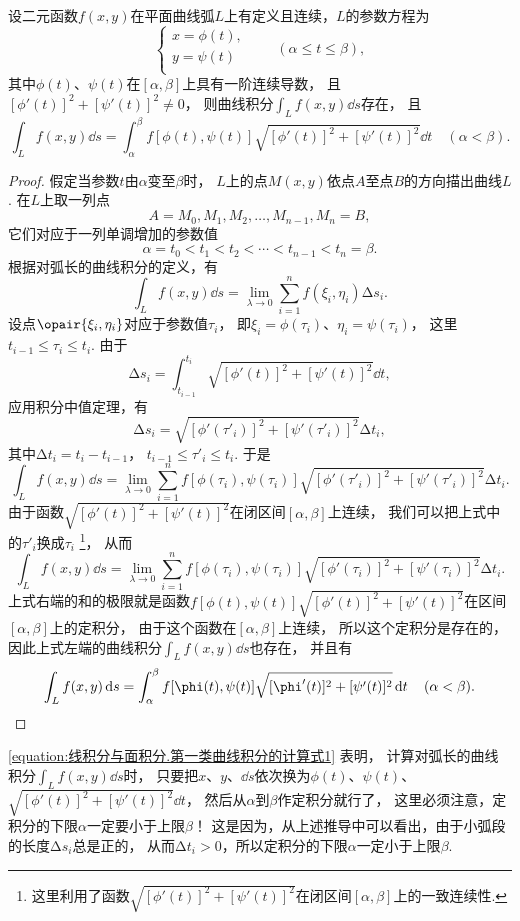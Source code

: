 \begin{theorem}
设二元函数\(f(x,y)\)在平面曲线弧\(L\)上有定义且连续，\(L\)的参数方程为\[
\left\{ \begin{array}{l}
x = \phi(t), \\
y = \psi(t) \\
\end{array} \right.
\qquad
(\alpha \leq t \leq \beta),
\]其中\(\phi(t)\)、\(\psi(t)\)在\([\alpha,\beta]\)上具有一阶连续导数，
且\([\phi'(t)]^2+[\psi'(t)]^2 \neq 0\)，
则曲线积分\(\int_L f(x,y) \dd{s}\)存在，
且\begin{equation}\label{equation:线积分与面积分.第一类曲线积分的计算式1}
\int_L f(x,y) \dd{s}
= \int_\alpha^\beta f[\phi(t),\psi(t)] \sqrt{[\phi'(t)]^2+[\psi'(t)]^2} \dd{t}
\quad(\alpha<\beta).
\end{equation}
\begin{proof}
假定当参数\(t\)由\(\alpha\)变至\(\beta\)时，
\(L\)上的点\(M(x,y)\)依点\(A\)至点\(B\)的方向描出曲线\(L\).
在\(L\)上取一列点\[
A=M_0,M_1,M_2,\dotsc,M_{n-1},M_n=B,
\]它们对应于一列单调增加的参数值\[
\alpha=t_0<t_1<t_2<\dotsb<t_{n-1}<t_n=\beta.
\]根据对弧长的曲线积分的定义，有\[
\int_L f(x,y) \dd{s} = \lim_{\lambda\to0} \sum_{i=1}^n f(\xi_i,\eta_i) \increment s_i.
\]设点\(\opair{\xi_i,\eta_i}\)对应于参数值\(\tau_i\)，
即\(\xi_i=\phi(\tau_i)\)、\(\eta_i=\psi(\tau_i)\)，
这里\(t_{i-1}\leq\tau_i\leq t_i\).
由于\[
\increment s_i = \int_{t_{i-1}}^{t_i} \sqrt{[\phi'(t)]^2+[\psi'(t)]^2} \dd{t},
\]应用积分中值定理，有\[
\increment s_i = \sqrt{[\phi'(\tau'_i)]^2+[\psi'(\tau'_i)]^2} \increment t_i,
\]其中\(\increment t_i = t_i - t_{i-1}\)，
\(t_{i-1} \leq \tau'_i \leq t_i\).
于是\[
\int_L f(x,y) \dd{s}
= \lim_{\lambda\to0} \sum_{i=1}^n f[\phi(\tau_i),\psi(\tau_i)] \sqrt{[\phi'(\tau'_i)]^2+[\psi'(\tau'_i)]^2} \increment t_i.
\]由于函数\(\sqrt{[\phi'(t)]^2+[\psi'(t)]^2}\)在闭区间\([\alpha,\beta]\)上连续，
我们可以把上式中的\(\tau'_i\)换成\(\tau_i\)
\footnote{这里利用了函数\(\sqrt{[\phi'(t)]^2+[\psi'(t)]^2}\)在闭区间\([\alpha,\beta]\)上的一致连续性.}，
从而\[
\int_L f(x,y) \dd{s}
= \lim_{\lambda\to0} \sum_{i=1}^n f[\phi(\tau_i),\psi(\tau_i)] \sqrt{[\phi'(\tau_i)]^2+[\psi'(\tau_i)]^2} \increment t_i.
\]上式右端的和的极限就是函数\(f[\phi(t),\psi(t)] \sqrt{[\phi'(t)]^2+[\psi'(t)]^2}\)在区间\([\alpha,\beta]\)上的定积分，
由于这个函数在\([\alpha,\beta]\)上连续，
所以这个定积分是存在的，
因此上式左端的曲线积分\(\int_L f(x,y) \dd{s}\)也存在，
并且有\[
\int_L f(x,y) \dd{s}
=\int_\alpha^\beta
 f[\phi(t),\psi(t)]
 \sqrt{[\phi'(t)]^2+[\psi'(t)]^2}
 \dd{t}
\quad(\alpha<\beta).
\qedhere
\]
\end{proof}
\end{theorem}
\cref{equation:线积分与面积分.第一类曲线积分的计算式1} 表明，
计算对弧长的曲线积分\(\int_L f(x,y) \dd{s}\)时，
只要把\(x\)、\(y\)、\(\dd{s}\)依次换为\(\phi(t)\)、\(\psi(t)\)、\(\sqrt{[\phi'(t)]^2+[\psi'(t)]^2} \dd{t}\)，
然后从\(\alpha\)到\(\beta\)作定积分就行了，
这里必须注意，定积分的下限\(\alpha\)一定要小于上限\(\beta\)！
这是因为，从上述推导中可以看出，由于小弧段的长度\(\increment s_i\)总是正的，
从而\(\increment t_i > 0\)，所以定积分的下限\(\alpha\)一定小于上限\(\beta\).

